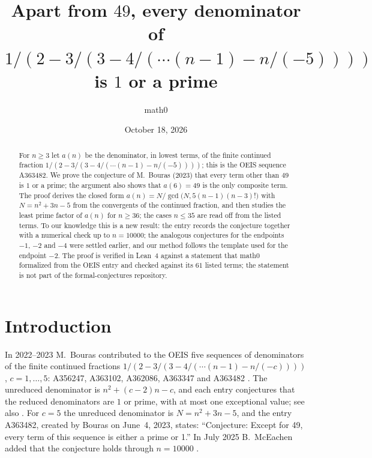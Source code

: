 \documentclass[11pt]{amsart}
\title[Denominators of a continued fraction (OEIS A363482)]{Apart from $49$, every denominator of $1/(2-3/(3-4/(\cdots(n-1)-n/(-5))))$ is $1$ or a prime}
\author{math0}
\date{October 18, 2026}
\theoremstyle{plain}
\theoremstyle{definition}
\begin{document}
\begin{abstract}
For $n\ge3$ let $a(n)$ be the denominator, in lowest terms, of the finite continued fraction $1/(2-3/(3-4/(\cdots(n-1)-n/(-5))))$; this is the OEIS sequence A363482.
We prove the conjecture of M.~Bouras (2023) that every term other than $49$ is $1$ or a prime; the argument also shows that $a(6)=49$ is the only composite term.
The proof derives the closed form $a(n)=N/\gcd\bigl(N,5(n-1)(n-3)!\bigr)$ with $N=n^2+3n-5$ from the convergents of the continued fraction, and then studies the least prime factor of $a(n)$ for $n\ge36$; the cases $n\le35$ are read off from the listed terms.
To our knowledge this is a new result: the entry records the conjecture together with a numerical check up to $n=10000$; the analogous conjectures for the endpoints $-1$, $-2$ and $-4$ were settled earlier, and our method follows the template used for the endpoint $-2$.
The proof is verified in Lean~4 against a statement that math0 formalized from the OEIS entry and checked against its $61$ listed terms; the statement is not part of the formal-conjectures repository.
\end{abstract}
\maketitle

\section{Introduction}

In 2022--2023 M.~Bouras contributed to the OEIS five sequences of denominators of the finite continued fractions $1/(2-3/(3-4/(\cdots(n-1)-n/(-c))))$, $c=1,\dots,5$: A356247, A363102, A362086, A363347 and A363482 \cite{A356247,A363102,A362086,A363347,A363482}. The unreduced denominator is $n^2+(c-2)n-c$, and each entry conjectures that the reduced denominators are $1$ or prime, with at most one exceptional value; see also \cite{Bslides,Barxiv}.
For $c=5$ the unreduced denominator is $N=n^2+3n-5$, and the entry A363482, created by Bouras on June~4, 2023, states: ``Conjecture: Except for 49, every term of this sequence is either a prime or 1.''
In July 2025 B.~McEachen added that the conjecture holds through $n=10000$ \cite{A363482}.
\end{document}
